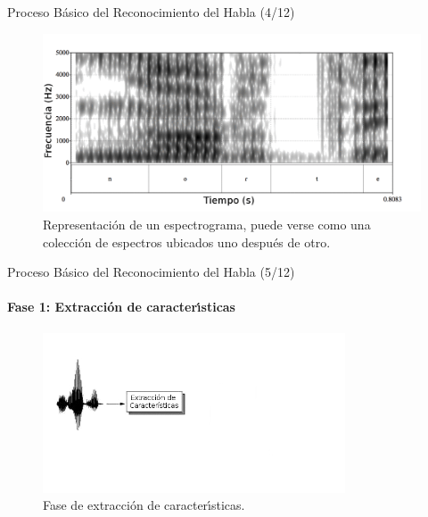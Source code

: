 \begin{frame}{Proceso B\'asico del Reconocimiento del Habla (4/12)}

\begin{figure}[H]
\centering
\includegraphics[width=1\linewidth]{./graphics/espectrograma.png}
\caption{Representaci\'on de un espectrograma, puede verse como una colecci\'on de espectros  ubicados uno despu\'es de otro.}
\label{figure:spectrogram}
\end{figure}

\end{frame}

\begin{frame}{Proceso B\'asico del Reconocimiento del Habla (5/12)}
\framesubtitle{Fase 1: Extracci\'on de caracter{\'\i}sticas}

\begin{figure}[H] 
\centering
\includegraphics[width=0.8\textwidth]{./graphics/extraccion_0.png}
\caption{Fase de extracci\'on de caracter{\'\i}sticas.}
\label{figure:hmm}
\end{figure}
\end{frame}


